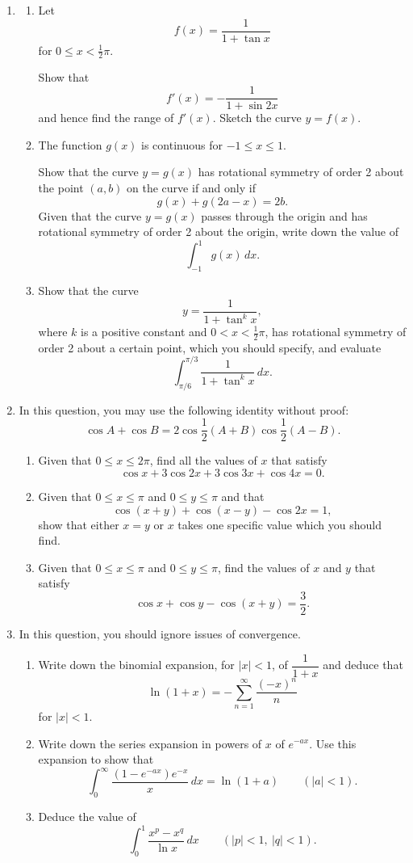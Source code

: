 \documentclass[12pt]{article}
\begin{document}
\begin{enumerate}
\item
\begin{enumerate}
\item Let
\[
f(x)=\frac{1}{1+\tan x}
\]
for $0\leq x<\frac{1}{2}\pi$.

Show that
\[
f'(x)=-\frac{1}{1+\sin 2x}
\]
and hence find the range of $f'(x)$. Sketch the curve $y=f(x)$.
\item The function $g(x)$ is continuous for $-1\leq x\leq 1$.

Show that the curve $y=g(x)$ has rotational symmetry of order 2 about the point $(a,b)$ on the curve if and only if
\[
g(x)+g(2a-x)=2b.
\]
Given that the curve $y=g(x)$ passes through the origin and has rotational symmetry of order 2 about the origin, write down the value of
\[
\int_{-1}^{1}g(x)\,dx.
\]
\item Show that the curve
\[
y=\frac{1}{1+\tan^k x},
\]
where $k$ is a positive constant and $0<x<\frac{1}{2}\pi$, has rotational symmetry of order 2 about a certain point, which you should specify, and evaluate
\[
\int_{\pi/6}^{\pi/3}\frac{1}{1+\tan^k x}\,dx.
\]
\end{enumerate}

\item In this question, you may use the following identity without proof:
\[
\cos A+\cos B=2\cos\frac{1}{2}(A+B)\cos\frac{1}{2}(A-B).
\]
\begin{enumerate}
\item Given that $0\leq x\leq 2\pi$, find all the values of $x$ that satisfy
\[
\cos x+3\cos 2x+3\cos 3x+\cos 4x=0.
\]
\item Given that $0\leq x\leq \pi$ and $0\leq y\leq \pi$ and that
\[
\cos(x+y)+\cos(x-y)-\cos 2x=1,
\]
show that either $x=y$ or $x$ takes one specific value which you should find.
\item Given that $0\leq x\leq \pi$ and $0\leq y\leq \pi$, find the values of $x$ and $y$ that satisfy
\[
\cos x+\cos y-\cos(x+y)=\frac{3}{2}.
\]
\end{enumerate}

\item In this question, you should ignore issues of convergence.
\begin{enumerate}
\item Write down the binomial expansion, for $|x|<1$, of $\dfrac{1}{1+x}$ and deduce that
\[
\ln(1+x)=-\sum_{n=1}^{\infty}\frac{(-x)^n}{n}
\]
for $|x|<1$.
\item Write down the series expansion in powers of $x$ of $e^{-ax}$. Use this expansion to show that
\[
\int_{0}^{\infty}\frac{(1-e^{-ax})e^{-x}}{x}\,dx=\ln(1+a)\qquad (|a|<1).
\]
\item Deduce the value of
\[
\int_{0}^{1}\frac{x^p-x^q}{\ln x}\,dx\qquad (|p|<1,\ |q|<1).
\]
\end{enumerate}


\end{enumerate}
\end{document}
